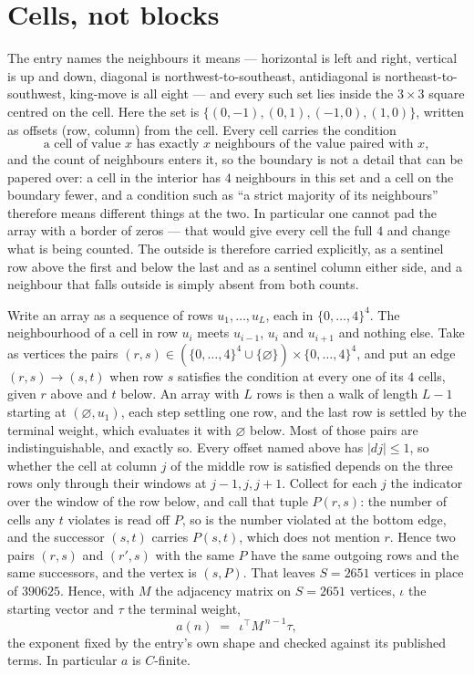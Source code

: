 \documentclass[11pt,a4paper]{article}
\theoremstyle{plain}
\theoremstyle{definition}
\begin{document}
\section{Cells, not blocks}

The entry names the neighbours it means --- horizontal is left and right, vertical is up and
down, diagonal is northwest-to-southeast, antidiagonal is northeast-to-southwest, king-move is
all eight --- and every such set lies inside the $3\times3$ square centred on the cell. Here
the set is $\{(0,-1), (0,1), (-1,0), (1,0)\}$, written as offsets (row, column) from the cell. Every cell carries
the condition
\[
\text{a cell of value }x\text{ has exactly }x\text{ neighbours of the value paired with }x,
\]
and the count of neighbours enters it, so the boundary is not a detail that can be papered
over: a cell in the interior has $4$ neighbours in this set and a cell on the boundary
fewer, and a condition such as ``a strict majority of its neighbours'' therefore means
different things at the two. In particular one cannot pad the array with a border of zeros ---
that would give every cell the full $4$ and change what is being counted. The outside is
therefore carried
explicitly, as a sentinel row above the first and below the last and as a sentinel column
either side, and a neighbour that falls outside is simply absent from both counts.

Write an array as a sequence of rows $u_1,\dots,u_L$, each in
$\{0,\dots,4\}^{4}$. The neighbourhood of a cell in row $u_i$ meets $u_{i-1}$,
$u_i$ and $u_{i+1}$ and nothing else. Take as vertices the pairs
$(r,s)\in(\{0,\dots,4\}^{4}\cup\{\varnothing\})\times\{0,\dots,4\}^{4}$,
and put an edge $(r,s)\to(s,t)$ when row $s$ satisfies the condition at every one of its
$4$ cells, given $r$ above and $t$ below. An array with $L$ rows is then a walk of length
$L-1$ starting at $(\varnothing,u_1)$, each step settling one row, and the last row is
settled by the terminal weight, which evaluates it with $\varnothing$ below. Most of those pairs are indistinguishable, and exactly so. Every offset named above has $|dj|\le 1$, so whether the cell at column $j$ of the middle row is satisfied depends on the three rows only through their windows at $j-1,j,j+1$. Collect for each $j$ the indicator over the window of the row below, and call that tuple $P(r,s)$: the number of cells any $t$ violates is read off $P$, so is the number violated at the bottom edge, and the successor $(s,t)$ carries $P(s,t)$, which does not mention $r$. Hence two pairs $(r,s)$ and $(r',s)$ with the same $P$ have the same outgoing rows and the same successors, and the vertex is $(s,P)$. That leaves $S=2651$ vertices in place of $390625$. Hence,
with $M$ the adjacency matrix on $S=2651$ vertices, $\iota$ the starting vector and $\tau$ the
terminal weight,
\[
a(n)\;=\;\,\iota^{\!\top}M^{\,n-1}\tau ,
\]
the exponent fixed by the entry's own shape and checked against its published terms. In
particular $a$ is $C$-finite.
\end{document}
